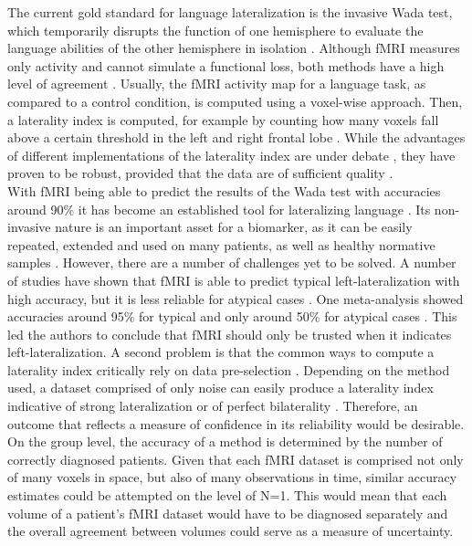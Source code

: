 \documentclass[fleqn,10pt]{SelfArx} %
\begin{document}
The current gold standard for language lateralization is the invasive Wada test, which temporarily disrupts the function of one hemisphere to evaluate the language abilities of the other hemisphere in isolation \citep{Kurthen_1994}. Although fMRI measures only activity and cannot simulate a functional loss, both methods have a high level of agreement \citep{Binder_1996, Adcock_2003, Woermann_2003, Dym_2011, Janecek_2013}. Usually, the fMRI activity map for a language task, as compared to a control condition, is computed using a voxel-wise approach. Then, a laterality index is computed, for example by counting how many voxels fall above a certain threshold in the left and right frontal lobe \citep{Wilke_2007, Bradshaw_2017_meth}. While the advantages of different implementations of the laterality index are under debate \citep{Wilke_2007, Bradshaw_2017_meth}, they have proven to be robust, provided that the data are of sufficient quality \citep{Wegrzyn_2019}.\\
With fMRI being able to predict the results of the Wada test with accuracies around 90\% \citep{Dym_2011, Bauer_2014} it has become an established tool for lateralizing language \citep{Binder_2011, Szaflarski_2017, Benjamin_2018}. Its non-invasive nature is an important asset for a biomarker, as it can be easily repeated, extended and used on many patients, as well as healthy normative samples \citep{Gabrieli_2015, Dubois_2016}. However, there are a number of challenges yet to be solved. A number of studies have shown that fMRI is able to predict typical left-lateralization with high accuracy, but it is less reliable for atypical cases \citep{Benke_2006, Arora_2009, Janecek_2013, Benjamin_2018}. One meta-analysis showed accuracies around 95\% for typical and only around 50\% for atypical cases \citep{Bauer_2014}. This led the authors to conclude that fMRI should only be trusted when it indicates left-lateralization. A second problem is that the common ways to compute a laterality index critically rely on data pre-selection \citep{Wilke_2007, Benjamin_2017}. Depending on the method used, a dataset comprised of only noise can easily produce a laterality index indicative of strong lateralization or of perfect bilaterality \citep{Wegrzyn_2019}. Therefore, an outcome that reflects a measure of confidence in its reliability would be desirable. On the group level, the accuracy of a method is determined by the number of correctly diagnosed patients. Given that each fMRI dataset is comprised not only of many voxels in space, but also of many observations in time, similar accuracy estimates could be attempted on the level of N=1. This would mean that each volume of a patient’s fMRI dataset would have to be diagnosed separately and the overall agreement between volumes could serve as a measure of uncertainty.\\
\end{document}
